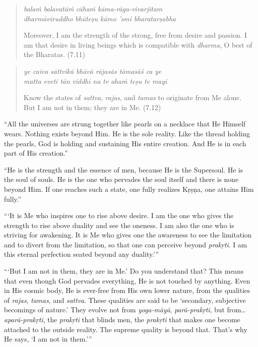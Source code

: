 \documentclass[12pt, twoside, openright]{memoir}
\begin{document}
\par
\begin{verse}
\textit{balaṁ balavatāṁ cāhaṁ kāma-rāga-vivarjitam} \\
\textit{dharmāviruddho bhūteṣu kāmo ’smi bharatarṣabha}

\noindent Moreover, I am the strength of the strong, free from desire and passion. I am that desire in living beings which is compatible with \textit{dharma}, O best of the Bharatas. (7.11)
\end{verse}
\par



\par
\begin{verse}
\textit{ye caiva sāttvikā bhāvā rājasās tāmasāś ca ye} \\
\textit{matta eveti tān viddhi na tv ahaṁ teṣu te mayi}

\noindent Know the states of \textit{sattva}, \textit{rajas}, and \textit{tamas} to originate from Me alone. But I am not in them; they are in Me. (7.12)
\end{verse}
\par


\enquote{All the universes are strung together like pearls on a necklace that He Himself wears. Nothing exists beyond Him. He is the sole reality. Like the thread holding the pearls, God is holding and sustaining His entire creation. And He is in each part of His creation.}

\enquote{He is the strength and the essence of men, because He is the Supersoul. He is the soul of souls. He is the one who pervades the soul itself and there is none beyond Him. If one reaches such a state, one fully realizes Kṛṣṇa, one attains Him fully.}

\enquote{\enquote{It is Me who inspires one to rise above desire. I am the one who gives the strength to rise above duality and see the oneness. I am also the one who is striving for awakening. It is Me who gives one the awareness to see the limitation and to divert from the limitation, so that one can perceive beyond \textit{prakṛti}. I am this eternal perfection seated beyond any duality.}}

\enquote{\enquote{But I am not in them, they are in Me.} Do you understand that? This means that even though God pervades everything, He is not touched by anything. Even in His cosmic body, He is ever-free from His own lower nature, from the qualities of \textit{rajas}, \textit{tamas}, and \textit{sattva}. These qualities are said to be \enquote{secondary, subjective becomings of nature.} They evolve not from \textit{yoga-māyā}, \textit{parā-prakṛti}, but from\ldots \textit{aparā-prakṛti}, the \textit{prakṛti} that blinds men, the \textit{prakṛti} that makes one become attached to the outside reality. The supreme quality is beyond that. That’s why He says, \enquote{I am not in them.}}
\end{document}
